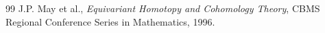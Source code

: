 \documentclass[11pt, openany]{book} %
\begin{document}

% 
% 
 

\backmatter
\begin{thebibliography}{99}
 J.P. May et al., \textit{Equivariant Homotopy and Cohomology Theory}, CBMS Regional Conference Series in Mathematics, 1996.
\end{thebibliography}
\end{document}
